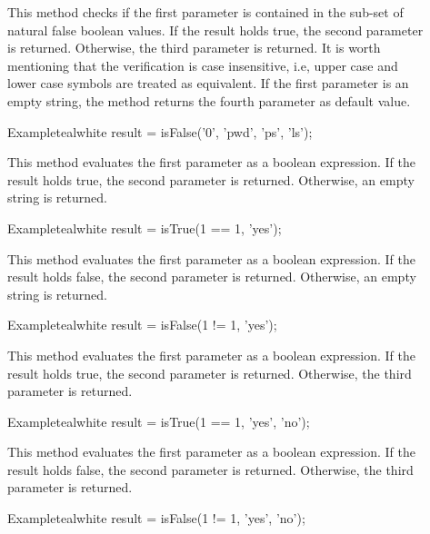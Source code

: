 \begin{description}
\item[] This method checks if the first parameter is contained in the sub-set of natural false boolean values. If the result holds true, the second parameter is returned. Otherwise, the third parameter is returned. It is worth mentioning that the verification is case insensitive, i.e, upper case and lower case symbols are treated as equivalent. If the first parameter is an empty string, the method returns the fourth parameter as default value.

\begin{codebox}{Example}{teal}{\icnote}{white}
result = isFalse('0', 'pwd', 'ps', 'ls');
\end{codebox}

\item[] This method evaluates the first parameter as a boolean expression. If the result holds true, the second parameter is returned. Otherwise, an empty string is returned.

\begin{codebox}{Example}{teal}{\icnote}{white}
result = isTrue(1 == 1, 'yes');
\end{codebox}

\item[] This method evaluates the first parameter as a boolean expression. If the result holds false, the second parameter is returned. Otherwise, an empty string is returned.

\begin{codebox}{Example}{teal}{\icnote}{white}
result = isFalse(1 != 1, 'yes');
\end{codebox}

\item[] This method evaluates the first parameter as a boolean expression. If the result holds true, the second parameter is returned. Otherwise, the third parameter is returned.

\begin{codebox}{Example}{teal}{\icnote}{white}
result = isTrue(1 == 1, 'yes', 'no');
\end{codebox}

\item[] This method evaluates the first parameter as a boolean expression. If the result holds false, the second parameter is returned. Otherwise, the third parameter is returned.

\begin{codebox}{Example}{teal}{\icnote}{white}
result = isFalse(1 != 1, 'yes', 'no');
\end{codebox}
\end{description}

